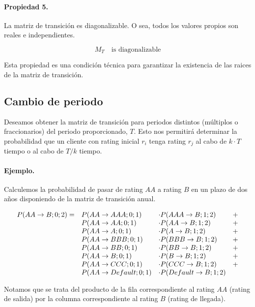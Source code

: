 \paragraph{Propiedad 5.}
La matriz de transici\'on es diagonalizable. O sea, todos los valores propios son
reales e independientes.

\begin{equation}
M_{T} \quad \textrm{is diagonalizable}
\end{equation}

Esta propiedad es una condici\'on t\'ecnica para garantizar la existencia de las
raices de la matriz de transici\'on.


\subsection{Cambio de periodo}
\label{mtrans:perchange}

Deseamos obtener la matriz de transici\'on para periodos distintos (m\'ultiplos o 
fraccionarios) del periodo proporcionado, $T$. Esto nos permitir\'a determinar la 
probabilidad que un cliente con rating inicial $r_i$ tenga rating $r_j$ al cabo 
de $k \cdot T$ tiempo o al cabo de $T/k$ tiempo.

\paragraph{Ejemplo.} Calculemos la probabilidad de pasar de rating $AA$ a
rating $B$ en un plazo de dos a\~nos disponiendo de la matriz de transici\'on anual.

\begin{displaymath}
\begin{array}{llll}
P(AA \to B;0;2) = & P(AA \to AAA;0;1)     & \cdot P(AAA \to B;1;2)     & + \cr
                  & P(AA \to AA;0;1)      & \cdot P(AA \to B;1;2)      & + \cr
                  & P(AA \to A;0;1)       & \cdot P(A \to B;1;2)       & + \cr
                  & P(AA \to BBB;0;1)     & \cdot P(BBB \to B;1;2)     & + \cr
                  & P(AA \to BB;0;1)      & \cdot P(BB \to B;1;2)      & + \cr
                  & P(AA \to B;0;1)       & \cdot P(B \to B;1;2)       & + \cr
                  & P(AA \to CCC;0;1)     & \cdot P(CCC \to B;1;2)     & + \cr
                  & P(AA \to Default;0;1) & \cdot P(Default \to B;1;2) &
\end{array}
\end{displaymath}

Notamos que se trata del producto de la fila correspondiente al rating $AA$ 
(rating de salida) por la columna correspondiente al rating $B$ (rating de 
llegada).

